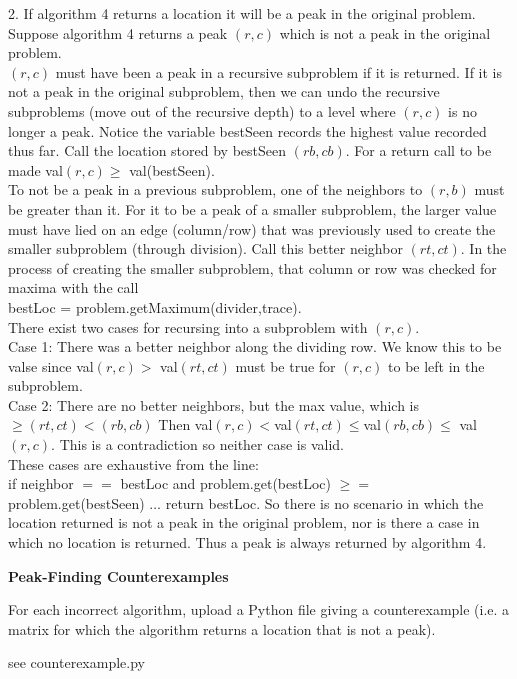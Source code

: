 \documentclass[12pt,twoside]{article}
\begin{document}
\begin{problems}
2. If algorithm 4 returns a location it will be  a peak in the original problem.
\\Suppose algorithm 4 returns a peak $(r,c)$ which is not a peak in the original problem.
\\$(r,c)$ must have been a peak in a recursive subproblem if it is returned.  If it is not a peak in the original subproblem, then we can undo the recursive subproblems (move out of the recursive depth) to a level where $(r,c)$ is no longer a peak.  Notice the variable bestSeen records the highest value recorded thus far.  Call the location stored by bestSeen $(rb,cb)$.  For a return call to be made val$(r,c) \geq$ val(bestSeen).\\
To not be a peak in a previous subproblem, one of the neighbors to $(r,b)$ must be greater than it. For it to be a peak of a smaller subproblem, the larger value must have lied on an edge (column/row) that was previously used to create the smaller subproblem (through division).  Call this better neighbor $(rt,ct)$.  In the process of creating the smaller subproblem, that column or row was checked for maxima with the call\\
bestLoc = problem.getMaximum(divider,trace).
\\There exist two cases for recursing into a subproblem with $(r,c)$.
\\Case 1: There was a better neighbor along the dividing row.  We know this to be valse since val$(r,c) >$ val$(rt,ct)$ must be true for $(r,c)$ to be left in the subproblem.
\\Case 2: There are no better neighbors, but the max value, which is $\geq (rt,ct) < (rb,cb)$
Then val$(r,c) < $val$(rt,ct) \leq $val$(rb,cb) \leq$ val$(r,c)$.  This is a contradiction so neither case is valid.
\\These cases are exhaustive from the line:
\\if neighbor $==$ bestLoc and problem.get(bestLoc) $\geq=$ problem.get(bestSeen) $\ldots$ return bestLoc.
So there is no scenario in which the location returned is not a peak in the original problem, nor is there a case in which no location is returned.  Thus a peak is always returned by algorithm 4.
\fi

\problem {} \textbf{Peak-Finding Counterexamples}

For each incorrect algorithm,
upload a Python file giving a counterexample
(i.e. a matrix for which the algorithm returns a location
that is not a peak).

\ifsolution \solution{}
see counterexample.py
\fi

\end{problems}
\end{document}
